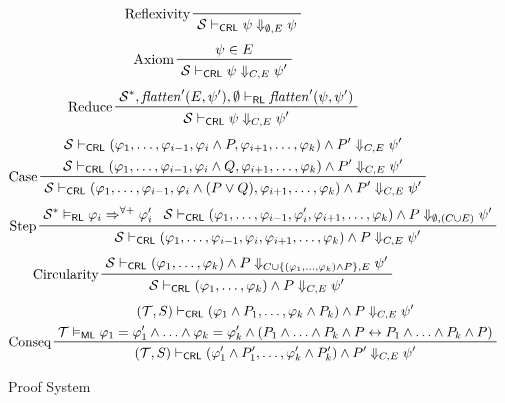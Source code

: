 \documentclass{article}
\newcommand{\RL}{\mathsf{RL}}
\newcommand{\ML}{\mathsf{ML}}
\newcommand{\CRL}{\mathsf{CRL}}
\begin{document}
\begin{figure}
    \centering
    \begin{align*}
    & \prftree[l]{Reflexivity}{\mathcal{S} \vdash_\CRL \psi \Downarrow_{\emptyset,E} \psi}
    \end{align*}
    \begin{align*}
    & \prftree[l]{Axiom}{\psi \in E}{\mathcal{S} \vdash_\CRL \psi \Downarrow_{C,E} \psi^\prime}
    \end{align*}
    \begin{align*}
    & \prftree[l]{Reduce}
      {\mathcal{S}^*, \mathit{flatten}^\prime(E, \psi^\prime), \emptyset \vdash_\RL
        \mathit{flatten}^\prime(\psi, \psi^\prime) }
      {\mathcal{S} \vdash_\CRL \psi \Downarrow_{C,E} \psi^\prime}
    \end{align*}
    \begin{align*}
    & \prftree[l]{Case}
    { \prfStackPremises
      {\mathcal{S} \vdash_\CRL (\varphi_1, \ldots, \varphi_{i-1}, \varphi_i \land P, \varphi_{i+1}, \ldots, \varphi_k) \land P^\prime \Downarrow_{C, E} \psi^\prime }
      {\mathcal{S} \vdash_\CRL (\varphi_1, \ldots, \varphi_{i-1}, \varphi_i \land Q, \varphi_{i+1}, \ldots, \varphi_k) \land P^\prime \Downarrow_{C, E} \psi^\prime }
    }
    {\mathcal{S} \vdash_\CRL (\varphi_1, \ldots, \varphi_{i-1}, \varphi_i \land (P \lor Q), \varphi_{i+1}, \ldots, \varphi_k) \land P^\prime \Downarrow_{C, E} \psi^\prime}
    \end{align*}
    \begin{align*}
    & \prftree[l]{Step}
    { \mathcal{S}^* \vDash_\RL \varphi_i \Rightarrow^{\forall+} \varphi_i^\prime}
    { \mathcal{S} \vdash_\CRL (\varphi_1, \ldots, \varphi_{i-1}, \varphi_i^\prime, \varphi_{i+1}, \ldots, \varphi_k)
      \land P
      \Downarrow_{\emptyset, (C \cup E)} \psi^\prime
    }
    {\mathcal{S} \vdash_\CRL (\varphi_1, \ldots, \varphi_{i-1}, \varphi_i, \varphi_{i+1}, \ldots, \varphi_k) \land P \Downarrow_{C, E} \psi^\prime}
    \end{align*}
    \begin{align*}
    & \prftree[l]{Circularity}
      { \mathcal{S} \vdash_\CRL (\varphi_1, \ldots, \varphi_k) \land P \Downarrow_{C \cup \{ (\varphi_1, \ldots, \varphi_k) \land P \} , E} \psi^\prime}
      { \mathcal{S} \vdash_\CRL (\varphi_1, \ldots, \varphi_k) \land P \Downarrow_{C, E} \psi^\prime}
    \end{align*}
    \begin{align*}
    & \prftree[l]{Conseq}
      { \prfStackPremises
        { (\mathcal{T}, S) \vdash_\CRL (\varphi_1 \land P_1, \ldots, \varphi_k \land P_k) \land P \Downarrow_{C, E} \psi^\prime}
        { \mathcal{T} \vDash_\ML \varphi_1 = \varphi_1^\prime \land \ldots \land \varphi_k = \varphi_k^\prime
        \land (P_1 \land \ldots \land P_k \land P \leftrightarrow P_1 \land \ldots \land P_k \land P) }
      }
      { (\mathcal{T}, S) \vdash_\CRL (\varphi_1^\prime \land P_1^\prime, \ldots, \varphi_k^\prime \land P_k^\prime) \land P^\prime \Downarrow_{C, E} \psi^\prime}
    \end{align*}
    \caption{Proof System}
    \label{fig:my_label}
\end{figure}
\end{document}
